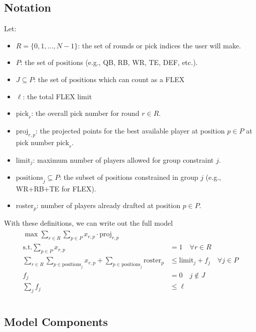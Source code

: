 \documentclass{article}
\begin{document}
\subsection{Notation}
Let:
\begin{itemize}
  \item \( R = \{0, 1, \ldots, N-1\} \): the set of rounds or pick indices the user will make.
  \item \( P \): the set of positions (e.g., QB, RB, WR, TE, DEF, etc.).
  \item $J \subseteq P$: the set of positions which can count as a FLEX
  \item $\ell$: the total FLEX limit
  \item \( \text{pick}_r \): the overall pick number for round \( r \in R \).
  \item \( \text{proj}_{r,p} \): the projected points for the best available player at position \( p \in P \) at pick number \( \text{pick}_r \).
  \item \( \text{limit}_j \): maximum number of players allowed for group constraint \( j \).
  \item \( \text{positions}_j \subseteq P \): the subset of positions constrained in group \( j \) (e.g., WR+RB+TE for FLEX).
  \item \( \text{roster}_p \): number of players already drafted at position \( p \in P \).
\end{itemize}
With these definitions, we can write out the full model
\begin{align}\label{model:mip}\tag{MIP}
\begin{aligned}
  \max \sum_{r \in R} \sum_{p \in P} x_{r,p} \cdot \text{proj}_{r,p}&\\
  \text{s.t.} \sum_{p \in P} x_{r,p} &= 1 \quad \forall r \in R\\
  \sum_{r \in R} \sum_{p \in \text{positions}_j} x_{r,p} + \sum_{p \in \text{positions}_j} \text{roster}_p &\leq \text{limit}_j + f_j \quad \forall j\in P\\
  f_j &= 0 \quad j \not\in J\\
  \sum_j f_j &\leq \ell\\
\end{aligned}
\end{align}

\subsection{Model Components}
\end{document}
